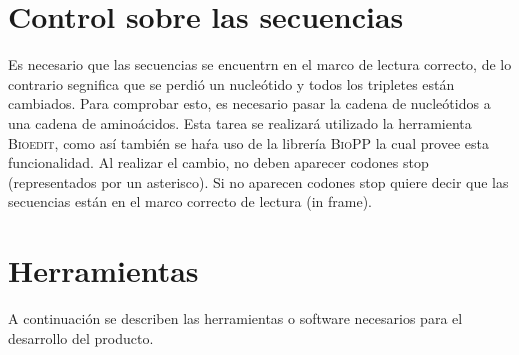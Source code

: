 \documentclass[12pt,a4paper,spanish]{article}
\begin{document}
		

\section{Control sobre las secuencias}	
	\par Es necesario que las secuencias se encuentrn en el marco de lectura correcto, de lo contrario segnifica que se 	perdió un nucleótido y todos los 		tripletes están cambiados. Para comprobar esto, es necesario pasar la cadena 		de nucleótidos a una cadena de aminoácidos. Esta tarea se realizará
	utilizado la herramienta \textsc{Bioedit}, como así también se haŕa uso de la librería \textsc{BioPP} la cual provee esta funcionalidad.	
	Al realizar el cambio, no deben aparecer codones stop (representados por un asterisco). Si no aparecen codones stop quiere decir que las secuencias 	están en el marco correcto de lectura (in frame).
	
\section{Herramientas} 
	A continuación se describen las herramientas o software necesarios para el desarrollo del producto.
\end{document}
